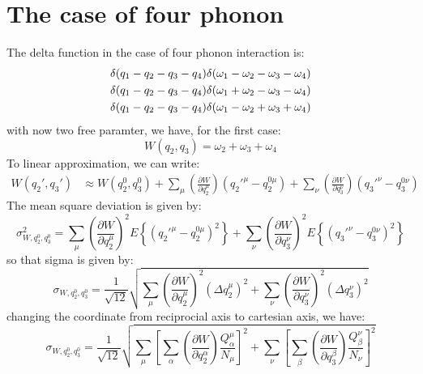 \documentclass{article}
\newcommand{\pfrac}[2]{\frac{\partial #1}{\partial #2}}
\begin{document}
\section{The case of four phonon}
The delta function in the case of four phonon interaction is:
\begin{gather}
    \delta(q_1 - q_2 - q_3 - q_4)\delta(\omega_1 - \omega_2 - \omega_3 - \omega_4) \notag \\
    \delta(q_1 - q_2 - q_3 - q_4)\delta(\omega_1 + \omega_2 - \omega_3 - \omega_4) \notag \\
    \delta(q_1 - q_2 - q_3 - q_4)\delta(\omega_1 - \omega_2 + \omega_3 + \omega_4) \notag \\
\end{gather}
with now two free paramter, we have, for the first case:
\begin{equation}
    W(q_2, q_3) = \omega_2 + \omega_3 + \omega_4
\end{equation}
To linear approximation, we can write:
\begin{align}
    W(q_2',q_3') &\approx W(q_2^0,q_3^0) 
                + \sum_\mu \left( \pfrac{W}{q_2^{\mu}} \right) \left( q_2'^{\mu} - q_2^{0\mu}\right)
                + \sum_\nu \left( \pfrac{W}{q_3^{\nu}} \right) \left( q_3'^{\nu} - q_3^{0\nu}\right)
\end{align}
The mean square deviation is given by:
\begin{equation}
    \sigma^2_{W,q_2^0,q_3^0} = \sum_\mu \left( \pfrac{W}{q_2^{\mu}} \right)^2 E\left\{ \left( q_2'^{\mu} - q_2^{0\mu}\right)^2 \right\}
                             + \sum_\nu \left( \pfrac{W}{q_3^{\nu}} \right)^2 E\left\{ \left( q_3'^{\nu} - q_3^{0\nu}\right)^2 \right\}
\end{equation}
so that sigma is given by:
\begin{equation}
    \sigma_{W,q_2^0,q_3^0} = \frac{1}{\sqrt{12}} \sqrt{ \sum_\mu \left( \pfrac{W}{q_2^{\mu}} \right)^2 ( \Delta q_2^{\mu} )^2 
                                                      + \sum_\nu \left( \pfrac{W}{q_3^{\nu}} \right)^2 ( \Delta q_3^{\nu} )^2   } 
\end{equation}
changing the coordinate from reciprocial axis to cartesian axis, we have:
\begin{equation}
    \sigma_{W,q_2^0,q_3^0} = \frac{1}{\sqrt{12}} 
        \sqrt{ \sum_\mu \left[ \sum_{\alpha}\left( \pfrac{W}{q_2^{\alpha}} \right) \frac{Q_{\alpha}^{\mu}}{ N_{\mu}}  \right]^2 
             + \sum_\nu \left[ \sum_{\beta}\left( \pfrac{W}{q_3^{\beta}} \right) \frac{Q_{\beta}^{\nu}}{ N_{\nu}}  \right]^2  } 
\end{equation}
\end{document}
